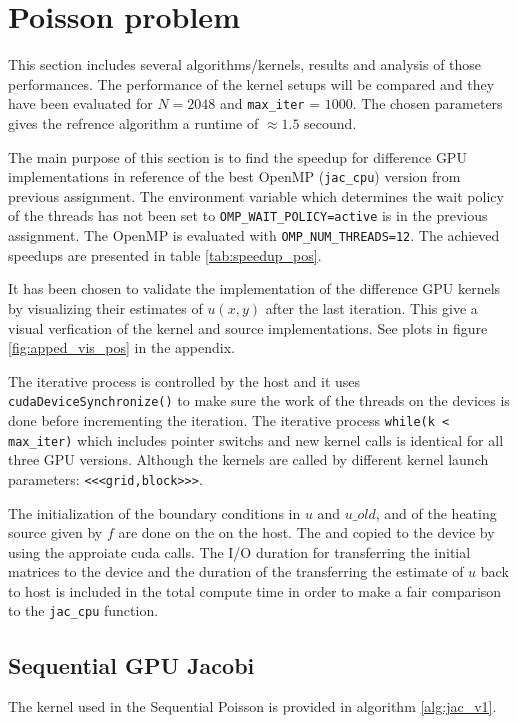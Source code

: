 \section{Poisson problem}
This section includes several algorithms/kernels, results and analysis of those performances. 
The performance of the kernel setups will be compared and they have been evaluated for $N = 2048$ and \texttt{max\_iter} = $1000$. The chosen parameters gives the refrence algorithm a runtime of $\approx1.5$ secound.

\noindent The main purpose of this section is to find the speedup for difference GPU implementations in reference of the best OpenMP (\texttt{jac\_cpu}) version from previous assignment. The environment variable which determines the wait policy of the threads has not been set to \texttt{OMP\_WAIT\_POLICY=active} is in the previous assignment. The OpenMP is evaluated with \texttt{OMP\_NUM\_THREADS=12}.
The achieved speedups are presented in table \ref{tab:speedup_pos}.

\noindent It has been chosen to validate the implementation of the difference GPU kernels by visualizing their estimates of $u(x,y)$ after the last iteration. This give a visual verfication of the kernel and source implementations. See plots in figure \ref{fig:apped_vis_pos} in the appendix.

\noindent The iterative process is controlled by the host and it uses \texttt{cudaDeviceSynchronize()} to make sure the work of the threads on the devices is done before incrementing the iteration. The iterative process \texttt{while(k < max\_iter)} which includes pointer switchs and new kernel calls is identical for all three GPU versions. Although the kernels are called by different 
kernel launch parameters: \texttt{<<<grid,block>>>}.

\noindent The initialization of the boundary conditions in $u$ and $u\_old$, and of the heating source given by $f$ are done on the on the host. The and copied to the device by using the approiate cuda calls.  
The I/O duration for transferring the initial matrices to the device and the duration of the transferring the estimate of $u$ back to host is included in the total compute time in order to make a fair comparison to the \texttt{jac\_cpu} function.



\subsection{Sequential GPU Jacobi}
The kernel used in the Sequential Poisson is provided in algorithm \ref{alg:jac_v1}. 


